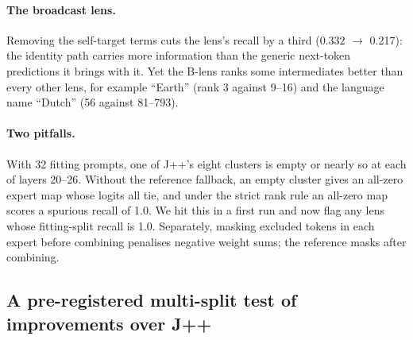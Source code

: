 \documentclass[11pt]{article}
\theoremstyle{definition}
\begin{document}
\paragraph{The broadcast lens.} Removing the self-target terms cuts the lens's recall by a third
(0.332 $\to$ 0.217): the identity path carries more information than the generic next-token
predictions it brings with it. Yet the B-lens ranks some intermediates better than every other lens,
for example ``Earth'' (rank 3 against 9--16) and the language name ``Dutch'' (56 against 81--793).

\paragraph{Two pitfalls.} With 32 fitting prompts, one of J++'s eight clusters is empty or nearly so at
each of layers 20--26. Without the reference fallback, an empty cluster gives an all-zero expert map
whose logits all tie, and under the strict rank rule an all-zero map scores a spurious recall of 1.0.
We hit this in a first run and now flag any lens whose fitting-split recall is 1.0. Separately,
masking excluded tokens in each expert before combining penalises negative weight sums; the
reference masks after combining.

\subsection{A pre-registered multi-split test of improvements over J++}
\label{sec:round2}
\end{document}

